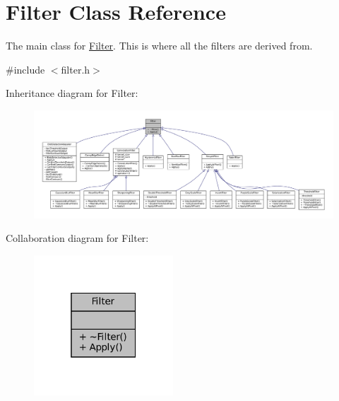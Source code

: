 \hypertarget{classFilter}{}\section{Filter Class Reference}
\label{classFilter}


The main class for \hyperlink{classFilter}{Filter}. This is where all the filters are derived from.  




{\ttfamily \#include $<$filter.\+h$>$}



Inheritance diagram for Filter\+:\nopagebreak
\begin{figure}[H]
\begin{center}
\leavevmode
\includegraphics[width=350pt]{classFilter__inherit__graph}
\end{center}
\end{figure}


Collaboration diagram for Filter\+:\nopagebreak
\begin{figure}[H]
\begin{center}
\leavevmode
\includegraphics[width=148pt]{classFilter__coll__graph}
\end{center}
\end{figure}
